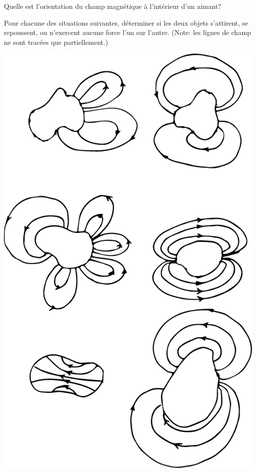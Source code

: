 
Quelle est l'orientation du champ magnétique à l'intérieur d'un aimant?


\begin{diapobox}

Pour chacune des situations suivantes, déterminer si les deux objets
s'attirent, se repoussent, ou n'exercent aucune force l'un sur l'autre. (Note:
les lignes de champ ne sont tracées que partiellement.)

\begin{center}
  \includegraphics[scale=0.5]{08-champ-magnetique/figures/exercice-champ-magnetique1.pdf}
\end{center}

\end{diapobox}


